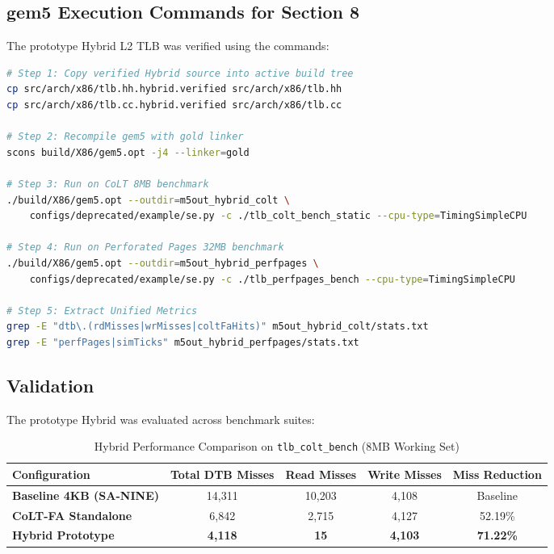 \subsection{gem5 Execution Commands for Section 8}
The prototype Hybrid L2 TLB was verified using the commands:

\begin{lstlisting}[float=H,language=bash,caption={Compilation and Execution Commands for Hybrid L2 TLB},label={lst:cmd_grand_hybrid}]
# Step 1: Copy verified Hybrid source into active build tree
cp src/arch/x86/tlb.hh.hybrid.verified src/arch/x86/tlb.hh
cp src/arch/x86/tlb.cc.hybrid.verified src/arch/x86/tlb.cc

# Step 2: Recompile gem5 with gold linker
scons build/X86/gem5.opt -j4 --linker=gold

# Step 3: Run on CoLT 8MB benchmark
./build/X86/gem5.opt --outdir=m5out_hybrid_colt \
    configs/deprecated/example/se.py -c ./tlb_colt_bench_static --cpu-type=TimingSimpleCPU

# Step 4: Run on Perforated Pages 32MB benchmark
./build/X86/gem5.opt --outdir=m5out_hybrid_perfpages \
    configs/deprecated/example/se.py -c ./tlb_perfpages_bench --cpu-type=TimingSimpleCPU

# Step 5: Extract Unified Metrics
grep -E "dtb\.(rdMisses|wrMisses|coltFaHits)" m5out_hybrid_colt/stats.txt
grep -E "perfPages|simTicks" m5out_hybrid_perfpages/stats.txt
\end{lstlisting}

\subsection{Validation}
The prototype Hybrid was evaluated across benchmark suites:

\begin{table}[H]
\centering
\small
\caption{Hybrid Performance Comparison on \texttt{tlb\_colt\_bench} (8MB Working Set)}
\label{tab:grand_hybrid_colt}
\begin{tabularx}{\textwidth}{lcccc}
\toprule
\textbf{Configuration} & \textbf{Total DTB Misses} & \textbf{Read Misses} & \textbf{Write Misses} & \textbf{Miss Reduction} \\
\midrule
\textbf{Baseline 4KB (SA-NINE)} & 14,311 & 10,203 & 4,108 & Baseline \\
\textbf{CoLT-FA Standalone} & 6,842 & 2,715 & 4,127 & 52.19\% \\
\textbf{Hybrid Prototype} & \textbf{4,118} & \textbf{15} & \textbf{4,103} & \textbf{71.22\%} \\
\bottomrule
\end{tabularx}
\end{table}

